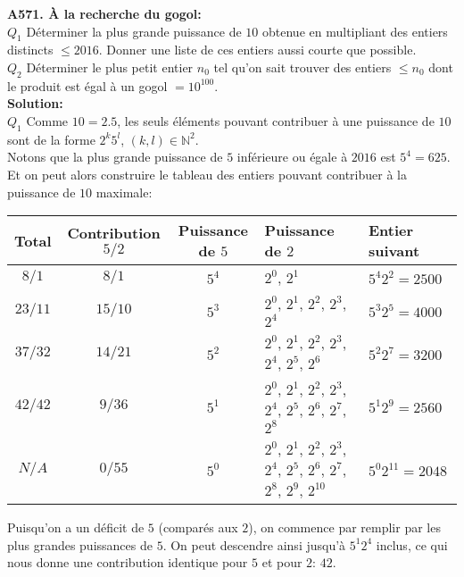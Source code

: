 \documentclass[11pt] {article}
\newcommand{\N} {\mathbb{N}}
\begin{document}



\textbf{A571. À la recherche du gogol:}\\
$Q_{1}$ Déterminer la plus grande puissance de $10$ obtenue en multipliant des entiers distincts $\leq 2016$. Donner une liste de ces entiers aussi courte que possible.\\
$Q_{2}$ Déterminer le plus petit entier $n_{0}$ tel qu'on sait trouver des entiers $\leq n_{0}$ dont le produit est égal à un gogol $= 10^{100}$.\\

\textbf{Solution:}\\
$Q_{1}$ Comme $10 = 2.5$, les seuls éléments pouvant contribuer à une puissance de $10$ sont de la forme $2^{k}5^{l}$, $\left( k,l \right) \in \N^{2}$.\\

Notons que la plus grande puissance de $5$ inférieure ou égale à $2016$ est $5^{4} = 625$. Et on peut alors construire le tableau des entiers pouvant contribuer à la puissance de $10$ maximale:\\

\begin{center}
	\begin{tabular}{cccll}
		Total & Contribution $5/2$	& Puissance de $5$	& Puissance de $2$	& Entier suivant \\
		\hline
		$8/1$	&	$8/1$	& $5^{4}$	& $2^{0}$, $2^{1}$	& $5^{4}2^{2} = 2500$ \\
		$23/11$	&	$15/10$	& $5^{3}$	& $2^{0}$, $2^{1}$, $2^{2}$, $2^{3}$, $2^{4}$	& $5^{3}2^{5} = 4000$ \\
		$37/32$	&	$14/21$	& $5^{2}$	& $2^{0}$, $2^{1}$, $2^{2}$, $2^{3}$, $2^{4}$, $2^{5}$, $2^{6}$	& $5^{2}2^{7} = 3200$ \\
		$42/42$	&	$9/36$	& $5^{1}$	& $2^{0}$, $2^{1}$, $2^{2}$, $2^{3}$, $2^{4}$, $2^{5}$, $2^{6}$, $2^{7}$, $2^{8}$	& $5^{1}2^{9} = 2560$ \\
		$N/A$	&	$0/55$	& $5^{0}$	& $2^{0}$, $2^{1}$, $2^{2}$, $2^{3}$, $2^{4}$, $2^{5}$, $2^{6}$, $2^{7}$, $2^{8}$, $2^{9}$, $2^{10}$	& $5^{0}2^{11} = 2048$ \\
	\end{tabular}
\end{center}

Puisqu'on a un déficit de $5$ (comparés aux $2$), on commence par remplir par les plus grandes puissances de $5$. On peut descendre ainsi jusqu'à $5^{1}2^{4}$ inclus, ce qui nous donne une contribution identique pour $5$ et pour $2$: $42$.
\end{document}
